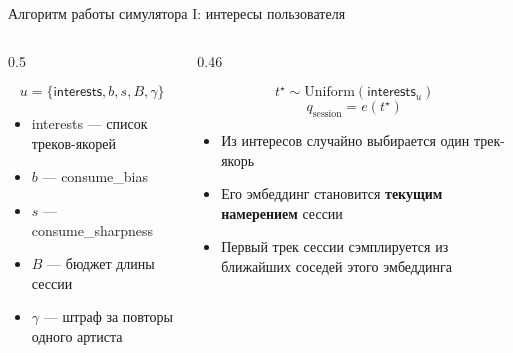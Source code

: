 \documentclass[11pt,aspectratio=169,handout]{beamer}
\newcommand{\code}[1]{\textsf{#1}}
\begin{document}
\begin{frame}{Алгоритм работы симулятора I: интересы пользователя}

\begin{columns}[T]
\begin{column}{0.5\textwidth}
\begin{tcolorbox}[colback=info!5,colframe=info!80,title=Профиль пользователя]
\footnotesize
\[
u = \{\code{interests}, b, s, B, \gamma\}
\]
\begin{itemize}
\item \code{interests} --- список треков-якорей
\item $b$ --- \code{consume\_bias}
\item $s$ --- \code{consume\_sharpness}
\item $B$ --- бюджет длины сессии
\item $\gamma$ --- штраф за повторы одного артиста
\end{itemize}
\end{tcolorbox}
\end{column}

\begin{column}{0.46\textwidth}
\begin{tcolorbox}[colback=info!5,colframe=info!80,title=Как стартует сессия]
\footnotesize
\[
t^\star \sim \mathrm{Uniform}(\code{interests}_u)
\]
\[
q_{\text{session}} = e(t^\star)
\]

\begin{itemize}
\item Из интересов случайно выбирается один трек-якорь
\item Его эмбеддинг становится \textbf{текущим намерением} сессии
\item Первый трек сессии сэмплируется из ближайших соседей этого эмбеддинга
\end{itemize}
\end{tcolorbox}
\end{column}
\end{columns}

\end{frame}
\end{document}
